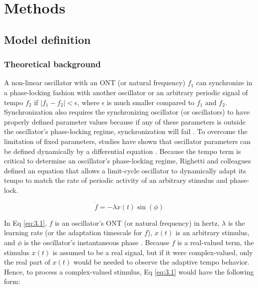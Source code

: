 \documentclass{report}
\begin{document}
\section{Methods}

\subsection{Model definition}

\subsubsection{Theoretical background}

A non-linear oscillator with an ONT (or natural frequency) $f_1$ can synchronize in a phase-locking fashion with another oscillator or an arbitrary periodic signal of tempo $f_2$ if $|f_1 − f_2| < \epsilon$, where $\epsilon$ is much smaller compared to $f_1$ and $f_2$. Synchronization also requires the synchronizing oscillator (or oscillators) to have properly defined parameter values because if any of these parameters is outside the oscillator's phase-locking regime, synchronization will fail \cite{righetti2006dynamic}. To overcome the limitation of fixed parameters, studies have shown that oscillator parameters can be defined dynamically by a differential equation \cite{acebron1998adaptive, borisyuk2001oscillatory, ermentrout1991adaptive, nakanishi2003learning, nishii1999learning, righetti2006dynamic}. Because the tempo term is critical to determine an oscillator's phase-locking regime, Righetti and colleagues \cite{righetti2006dynamic} defined an equation that allows a limit-cycle oscillator to dynamically adapt its tempo to match the rate of periodic activity of an arbitrary stimulus and phase-lock.

\begin{equation}
\dot{f} = -\lambda x(t) \sin(\phi) \label{eq:3.1}
\end{equation}

In Eq \eqref{eq:3.1}, $f$ is an oscillator's ONT (or natural frequency) in hertz, $\lambda$ is the learning rate (or the adaptation timescale for $f$), $x(t)$ is an arbitrary stimulus, and $\phi$ is the oscillator's instantaneous phase \cite{righetti2006dynamic}. Because $f$ is a real-valued term, the stimulus $x(t)$ is assumed to be a real signal, but if it were complex-valued, only the real part of $x(t)$ would be needed to observe the adaptive tempo behavior. Hence, to process a complex-valued stimulus, Eq \eqref{eq:3.1} would have the following form:
\end{document}
